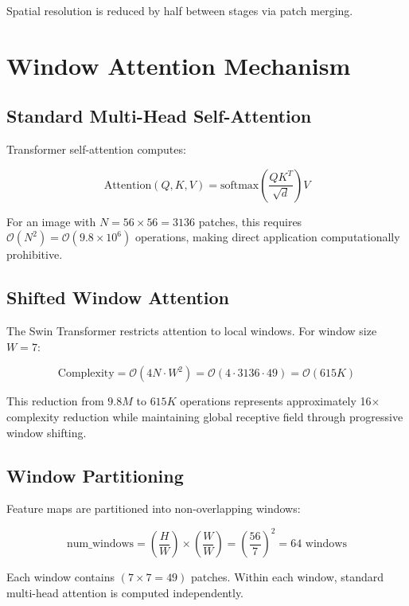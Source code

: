 Spatial resolution is reduced by half between stages via patch merging.

\section{Window Attention Mechanism}

\subsection{Standard Multi-Head Self-Attention}

Transformer self-attention computes:

\begin{equation}
\text{Attention}(Q, K, V) = \text{softmax}\left(\frac{QK^T}{\sqrt{d}}\right)V
\end{equation}

For an image with $N = 56 \times 56 = 3136$ patches, this requires $\mathcal{O}(N^2) = \mathcal{O}(9.8 \times 10^6)$ operations, making direct application computationally prohibitive.

\subsection{Shifted Window Attention}

The Swin Transformer restricts attention to local windows. For window size $W = 7$:

\begin{equation}
\text{Complexity} = \mathcal{O}(4N \cdot W^2) = \mathcal{O}(4 \cdot 3136 \cdot 49) = \mathcal{O}(615K)
\end{equation}

This reduction from $9.8M$ to $615K$ operations represents approximately 16$\times$ complexity reduction while maintaining global receptive field through progressive window shifting.

\subsection{Window Partitioning}

Feature maps are partitioned into non-overlapping windows:

\begin{equation}
\text{num\_windows} = \left(\frac{H}{W}\right) \times \left(\frac{W}{W}\right) = \left(\frac{56}{7}\right)^2 = 64 \text{ windows}
\end{equation}

Each window contains $(7 \times 7 = 49)$ patches. Within each window, standard multi-head attention is computed independently.

